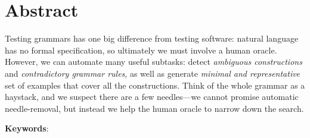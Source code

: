 \chapter*{Abstract}\label{chp:abstract}






Testing grammars has one big difference from testing software: natural
language has no formal specification, so ultimately we must involve a
human oracle. However, we can automate many useful subtasks: detect
\emph{ambiguous constructions} and \emph{contradictory grammar rules},
as well as generate \emph{minimal and representative} set of examples
that cover all the constructions.  Think of the whole grammar as a
haystack, and we suspect there are a few needles---we cannot promise
automatic needle-removal, but instead we help the human oracle to
narrow down the search.



\bigskip
\noindent
\textbf{Keywords}: \emph{\phdkeywords}
